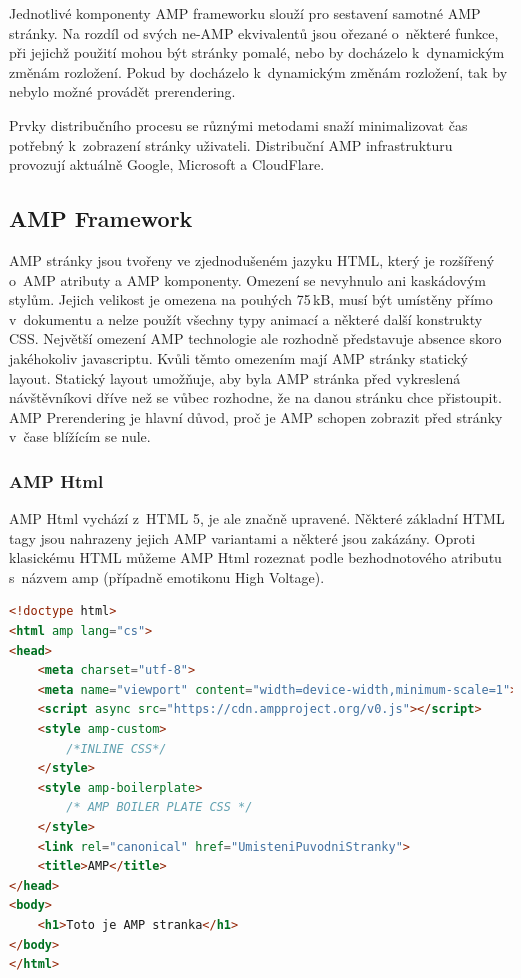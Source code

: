 Jednotlivé komponenty AMP frameworku slouží pro sestavení samotné AMP stránky. Na rozdíl od svých
ne-AMP ekvivalentů jsou ořezané o~některé funkce, při jejichž použití mohou být stránky pomalé, nebo
by docházelo k~dynamickým změnám rozložení. Pokud by docházelo k~dynamickým změnám rozložení,
tak by nebylo možné provádět prerendering.


Prvky distribučního procesu se různými metodami snaží minimalizovat čas potřebný k~zobrazení stránky
uživateli. Distribuční AMP infrastrukturu provozují aktuálně Google, Microsoft a CloudFlare\cite[Ch.\ 1, p.\ 49]{VzhuruDoAMP}.

\subsection*{AMP Framework}
AMP stránky jsou tvořeny ve zjednodušeném jazyku HTML, který je rozšířený o~AMP atributy a AMP
komponenty. Omezení se nevyhnulo ani kaskádovým stylům. Jejich velikost je omezena na pouhých
75\,kB, musí být umístěny přímo v~dokumentu a nelze použít všechny typy animací a některé další
konstrukty CSS.
Největší omezení AMP technologie ale rozhodně představuje absence skoro jakéhokoliv javascriptu.
Kvůli těmto omezením mají AMP stránky statický layout. Statický layout umožňuje, aby byla AMP stránka před vykreslená návštěvníkovi dříve než se vůbec rozhodne, že na danou stránku chce přistoupit. AMP Prerendering je hlavní důvod, proč je AMP schopen zobrazit před stránky v~čase blížícím se nule\cite{AMP-zero}.
\subsubsection*{AMP Html}
AMP Html vychází z~HTML 5, je ale značně upravené. Některé základní HTML tagy jsou nahrazeny jejich AMP variantami a některé jsou zakázány.
Oproti klasickému HTML můžeme AMP Html rozeznat podle bezhodnotového atributu s~názvem amp (případně emotikonu High Voltage).

\begin{lstlisting}[language=html, caption=Ukázka AMP Html,captionpos=t]
<!doctype html>
<html amp lang="cs">
<head>
    <meta charset="utf-8">
    <meta name="viewport" content="width=device-width,minimum-scale=1">
    <script async src="https://cdn.ampproject.org/v0.js"></script>
    <style amp-custom>
        /*INLINE CSS*/
    </style>
    <style amp-boilerplate>
        /* AMP BOILER PLATE CSS */
    </style>
    <link rel="canonical" href="UmisteniPuvodniStranky">
    <title>AMP</title>
</head>
<body>
    <h1>Toto je AMP stranka</h1>
</body>
</html>

\end{lstlisting}

